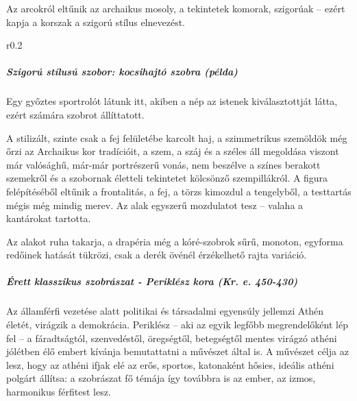 	Az arcokról eltűnik az archaikus mosoly, a tekintetek komorak, szigorúak – ezért kapja a korszak a szigorú stílus elnevezést.
	
	\begin{wrapfigure}{r}{0.2\textwidth}
	\end{wrapfigure}
	
	\subparagraph{Szigorú stílusú szobor: kocsihajtó szobra (példa)}
	Egy győztes sportrolót látunk itt, akiben a nép az istenek kiválasztottját látta, ezért számára szobrot állíttatott.
	
	A stilizált, szinte csak a fej felületébe karcolt haj, a szimmetrikus szemöldök még őrzi az Archaikus kor tradícióit, a szem, a száj és a széles áll megoldása viszont már valósághű, már-már portrészerű vonás, nem beszélve a színes berakott szemekről és a szobornak életteli tekintetet kölcsönző szempillákról. A figura felépítéséből eltűnik a frontalitás, a fej, a törzs kimozdul a tengelyből, a testtartás mégis még mindig merev. Az alak egyszerű mozdulatot tesz – valaha a kantárokat tartotta.
	
	Az alakot ruha takarja, a drapéria még a kóré-szobrok sűrű, monoton, egyforma redőinek hatását tükrözi, csak a derék övénél érzékelhető rajta variáció.
	
	\subparagraph{Érett klasszikus szobrászat - Periklész kora (Kr. e. 450-430)}
	Az államférfi vezetése alatt politikai és társadalmi egyensúly jellemzi Athén életét, virágzik a demokrácia. Periklész – aki az egyik legfőbb megrendelőként lép fel – a fáradtságtól, szenvedéstől, öregségtől, betegségtől mentes virágzó athéni jólétben élő embert kívánja bemutattatni a művészet által is. A művészet célja az lesz, hogy az athéni ifjak elé az erős, sportos, katonaként hősies, ideális athéni polgárt állítsa: a szobrászat fő témája így továbbra is az ember, az izmos, harmonikus férfitest lesz.
	
